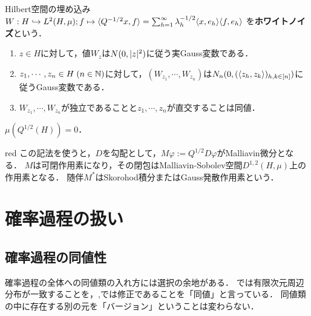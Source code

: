 \documentclass[uplatex,dvipdfmx]{jsreport}
\begin{document}
\begin{definition}\label{def-white-noise-1}
    Hilbert空間の埋め込み$W:H\hookrightarrow L^2(H,\mu);f\mapsto \langle Q^{-1/2}x,f\rangle=\sum_{h=1}^\infty\lambda_h^{-1/2}\langle x,e_h\rangle\langle f,e_h\rangle$
    を\textbf{ホワイトノイズ}という．
\end{definition}

\begin{proposition}\mbox{}\label{prop-property-of-white-noise}
    \begin{enumerate}
        \item $z\in H$に対して，値$W_z$は$N(0,\lvert z\rvert^2)$に従う実Gauss変数である．
        \item $z_1,\cdots,z_n\in H\;(n\in\mathbb{N})$に対して，$(W_{z_1},\cdots,W_{z_n})$は$N_n(0,(\langle z_h,z_k\rangle)_{h,k\in[n]})$に従うGauss変数である．
        \item $W_{z_1},\cdots,W_{z_n}$が独立であることと$z_1,\cdots,z_n$が直交することは同値．
    \end{enumerate}
\end{proposition}

\begin{proposition}
    $\mu(Q^{1/2}(H))=0$．
\end{proposition}

\begin{tbox}{red}{}
    この記法を使うと，$D$を勾配として，$M\varphi:=Q^{1/2}D\varphi$がMalliavin微分となる．
    $M$は可閉作用素になり，その閉包はMalliavin-Sobolev空間$D^{1,2}(H,\mu)$上の作用素となる．
    随伴$M^*$はSkorohod積分またはGauss発散作用素という．
\end{tbox}

\section{確率過程の扱い}

\subsection{確率過程の同値性}

\begin{tcolorbox}[colframe=ForestGreen, colback=ForestGreen!10!white,breakable,colbacktitle=ForestGreen!40!white,coltitle=black,fonttitle=\bfseries\sffamily,
title=]
    確率過程の全体への同値類の入れ方には選択の余地がある．
    \cite{Revus and Yor}では有限次元周辺分布が一致することを，\cite{Nualart},\cite{Prato}では修正であることを「同値」と言っている．
    同値類の中に存在する別の元を「バージョン」ということは変わらない．
\end{tcolorbox}
\end{document}
